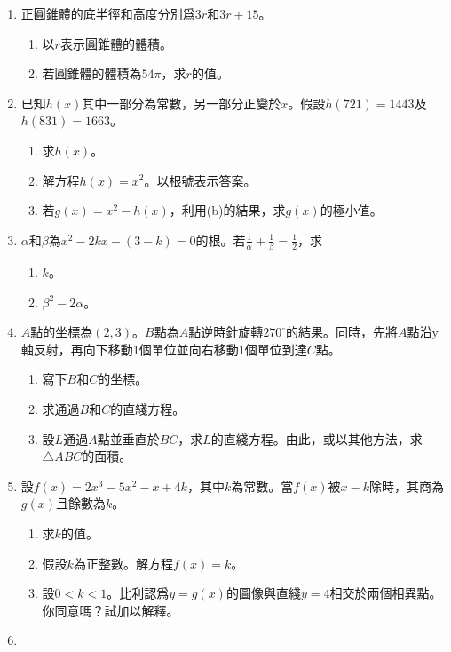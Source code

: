 \documentclass[12pt]{article}
\begin{document}
\begin{enumerate}
        \item 正圓錐體的底半徑和高度分別爲$3r$和$3r+15$。\begin{enumerate}
            \item 以$r$表示圓錐體的體積。
            \item 若圓錐體的體積為$54\pi$，求$r$的值。
        \end{enumerate}
        \item 已知$h(x)$其中一部分為常數，另一部分正變於$x$。假設$h(721)=1443$及$h(831)=1663$。\begin{enumerate}
            \item 求$h(x)$。
            \item 解方程$h(x)=x^2$。以根號表示答案。
            \item 若$g(x)=x^2-h(x)$，利用(b)的結果，求$g(x)$的極小值。
        \end{enumerate}
        \item $\alpha$和$\beta$為$x^2-2kx-(3-k)=0$的根。若$\frac{1}{\alpha}+\frac{1}{\beta}=\frac{1}{2}$，求\begin{enumerate}
            \item $k$。
            \item $\beta^2-2\alpha$。
        \end{enumerate}
        \item $A$點的坐標為$(2,3)$。$B$點為$A$點逆時針旋轉$270^\circ$的結果。同時，先將$A$點沿y軸反射，再向下移動1個單位並向右移動1個單位到達$C$點。\begin{enumerate}
            \item 寫下$B$和$C$的坐標。
            \item 求通過$B$和$C$的直綫方程。
            \item 設$L$通過$A$點並垂直於$BC$，求$L$的直綫方程。由此，或以其他方法，求$\triangle ABC$的面積。
        \end{enumerate}
        \item 設$f(x)=2x^3-5x^2-x+4k$，其中$k$為常數。當$f(x)$被$x-k$除時，其商為$g(x)$且餘數為$k$。\begin{enumerate}
            \item 求$k$的值。
            \item 假設$k$為正整數。解方程$f(x)=k$。
            \item 設$0<k<1$。比利認爲$y=g(x)$的圖像與直綫$y=4$相交於兩個相異點。你同意嗎？試加以解釋。
        \end{enumerate}
        \item \begin{enumerate}

\end{enumerate}
\end{enumerate}
\end{document}
